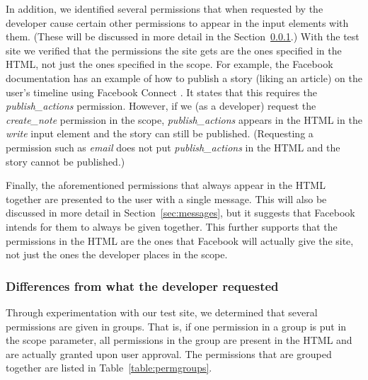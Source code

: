 \documentclass[10pt]{sig-alternate-10pt}
\begin{document}
In addition, we identified several permissions that when requested by the developer cause certain other permissions to appear in the input elements with them. (These will be discussed in more detail in the Section~\ref{sec:developerdiffs}.) With the test site we verified that the permissions the site gets are the ones specified in the HTML, not just the ones specified in the scope. For example, the Facebook documentation has an example of how to publish a story (liking an article) on the user's timeline using Facebook Connect \cite{fbexample}. It states that this requires the \emph{publish\_actions} permission. However, if we (as a developer) request the \emph{create\_note} permission in the scope, \emph{publish\_actions} appears in the HTML in the \emph{write} input element and the story can still be published. (Requesting a permission such as \emph{email} does not put \emph{publish\_actions} in the HTML and the story cannot be published.)

Finally, the aforementioned permissions that always appear in the HTML together are presented to the user with a single message. This will also be discussed in more detail in Section~\ref{sec:messages}, but it suggests that Facebook intends for them to always be given together. This further supports that the permissions in the HTML are the ones that Facebook will actually give the site, not just the ones the developer places in the scope.

\subsubsection{Differences from what the developer requested}
\label{sec:developerdiffs}

Through experimentation with our test site, we determined that several permissions are given in groups. That is, if one permission in a group is put in the scope parameter, all permissions in the group are present in the HTML and are actually granted upon user approval. The permissions that are grouped together are listed in Table~\ref{table:permgroups}.
\end{document}
